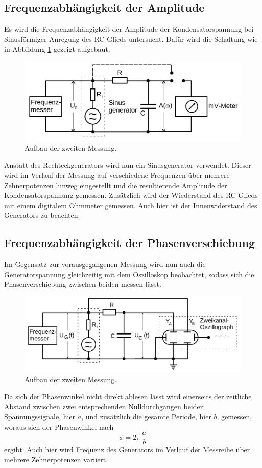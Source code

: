 \subsection{Frequenzabhängigkeit der Amplitude}
Es wird die Frequenzabhängigkeit der Amplitude der Kondensatorspannung bei Sinusförmiger Anregung des RC-Glieds untersucht.
Dafür wird die Schaltung wie in Abbildung \ref{fig:mess2} gezeigt aufgebaut.
\begin{figure}[H]
    \centering
    \includegraphics[width=\textwidth]{content/aufbau2.png}
    \caption{Aufbau der zweiten Messung.\cite{v353}}
    \label{fig:mess2}
\end{figure}
\noindent
Anstatt des Rechteckgenerators wird nun ein Sinusgenerator verwendet. Dieser wird im Verlauf der Messung auf verschiedene Frequenzen über mehrere Zehnerpotenzen hinweg eingestellt und die resultierende Amplitude der Kondensatorspannung gemessen.
Zusätzlich wird der Wiederstand des RC-Glieds mit einem digitalem Ohmmeter gemessen.
Auch hier ist der Innenwiderstand des Generators zu beachten.
%
\subsection{Frequenzabhängigkeit der Phasenverschiebung}
Im Gegensatz zur vorausgegangenen Messung wird nun auch die Generatorspannung gleichzeitig mit dem Oszilloskop beobachtet, sodass sich die Phasenverschiebung zwischen beiden messen lässt.
\begin{figure}[H]
    \centering
    \includegraphics[width=\textwidth]{content/aufbau3.png}
    \caption{Aufbau der zweiten Messung.\cite{v353}}
    \label{fig:mess3}
\end{figure}
\noindent
Da sich der Phasenwinkel nicht direkt ablesen lässt wird einerseits der zeitliche Abstand zwischen zwei entsprechenden Nulldurchgängen beider Spannungssignale, hier $a$, und zusätzlich die gesamte Periode, hier $b$, gemessen, woraus sich der Phasenwinkel nach
\begin{equation}
    \phi = 2\pi \, \frac{a}{b}
    \label{eqn:abphase}
\end{equation}
ergibt.
Auch hier wird Frequenz des Generators im Verlauf der Messreihe über mehrere Zehnerpotenzen variiert.
